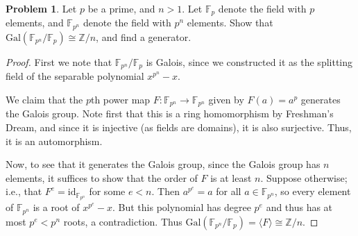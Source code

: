 \documentclass[11pt]{article}
\newcommand{\Z}{\mathbb{Z}}
\theoremstyle{definition}
\newtheorem{problem}{Problem}
\begin{document}
\begin{problem}
Let $p$ be a prime, and $n>1$. Let $\mathbb{F}_{p}$ denote the field with $p$ elements, and  $\mathbb{F}_{p^n}$ denote the field with $p^n$ elements. Show that $\mathrm{Gal}(\mathbb{F}_{p^n}/\mathbb{F}_{p})\cong \Z/n$, and find a generator.
\end{problem}

\begin{proof}
First we note that $\mathbb{F}_{p^n}/\mathbb{F}_{p}$ is Galois, since we constructed it as the splitting field of the separable polynomial $x^{p^n}-x$.

We claim that the $p$th power map $F:\mathbb{F}_{p^n} \to \mathbb{F}_{p^n}$ given by $F(a)=a^p$ generates the Galois group. Note first that this is a ring homomorphism by Freshman's Dream, and since it is injective (as fields are domains), it is also surjective. Thus, it is an automorphism.

Now, to see that it generates the Galois group, since the Galois group has $n$ elements, it suffices to show that the order of $F$ is at least $n$. Suppose otherwise; i.e., that $F^e=\mathrm{id}_{\mathbb{F}_{p^n}}$ for some $e<n$. Then $a^{p^e}=a$ for all $a\in \mathbb{F}_{p^n}$, so every element of $\mathbb{F}_{p^n}$ is a root of $x^{p^e}-x$. But this polynomial has degree $p^e$ and thus has at most $p^e<p^n$ roots, a contradiction. Thus $\mathrm{Gal}(\mathbb{F}_{p^n}/\mathbb{F}_{p})=\langle F \rangle \cong \Z/n$.
\end{proof}
\end{document}
